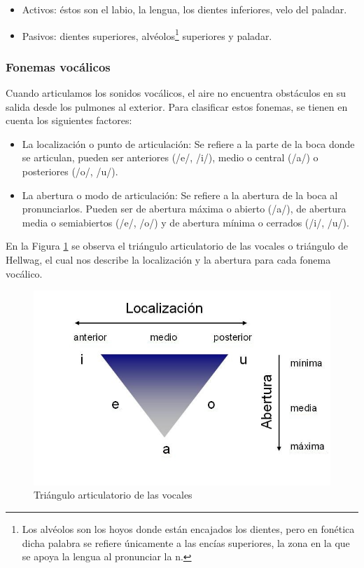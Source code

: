 \begin{itemize}
\item	Activos: éstos son el labio, la lengua, los dientes inferiores, velo del paladar. 
\item	Pasivos: dientes superiores, alvéolos\footnote{Los alvéolos son los hoyos donde están encajados los dientes, pero en fonética dicha palabra se refiere únicamente a las encías superiores, la zona en la que se apoya la lengua al pronunciar la n.}  superiores y paladar.
\end{itemize}

\subsubsection{Fonemas vocálicos}

Cuando articulamos los sonidos vocálicos, el aire no encuentra obstáculos en su salida desde los pulmones al exterior. Para clasificar estos fonemas, se tienen en cuenta los siguientes factores:

\begin{itemize}
\item	La localización o punto de articulación: Se refiere a la parte de la boca donde se articulan, pueden ser anteriores (/e/, /i/), medio o central (/a/) o posteriores (/o/, /u/).
\item	La abertura o modo de articulación: Se refiere a la abertura de la boca al pronunciarlos. Pueden ser de abertura máxima o abierto (/a/), de abertura media o semiabiertos (/e/, /o/) y de abertura mínima o cerrados (/i/, /u/). \cite{SantosPosada2004}
\end{itemize}

En la Figura \ref{fig:trianguloArticulatorio} se observa el triángulo articulatorio de las vocales o triángulo de Hellwag, el cual nos describe la localización y la abertura para cada fonema vocálico.

\begin{figure}[H]
	\centering
	\includegraphics[width=0.8\linewidth]{figures/trianguloArticulatorio}
	\caption{Triángulo articulatorio de las vocales}
	\label{fig:trianguloArticulatorio}
\end{figure}


